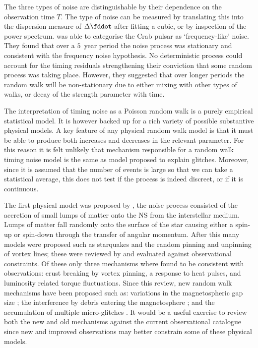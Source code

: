 The three types of noise are distinguishable by their dependence on the
observation time $T$. The type of noise can be measured by translating this
into the dispersion measure of $\Delta\fddot$ after fitting a cubic, or by
inspection of the power spectrum.  \citet{Boynton1972} was able to categorise
the Crab pulsar as `frequency-like' noise.  They found that over a $5$~year
period the noise process was stationary and consistent with the frequency noise
hypothesis. No deterministic process could account for the timing residuals
strengthening their conviction that some random process was taking place.
However, they suggested that over longer periods the random walk will be
non-stationary due to either mixing with other types of walks, or decay of the
strength parameter with time.

The interpretation of timing noise as a Poisson random walk is a purely
empirical statistical model. It is however backed up for a rich variety of
possible substantive physical models.  A key feature of any physical random
walk model is that it must be able to produce both increases and decreases in
the relevant parameter. For this reason it is felt unlikely that mechanism
responsible for a random walk timing noise model is the same as model proposed
to explain glitches. Moreover, since it is assumed that the number of events
is large so that we can take a statistical average, this does not test if the
process is indeed discreet, or if it is continuous.

The first physical model was proposed by \citet{Boynton1972}, the noise process
consisted of the accretion of small lumps of matter onto the NS from the
interstellar medium. Lumps of matter fall randomly onto the surface of the star
causing either a spin-up or spin-down through the transfer of angular momentum.
After this many models were proposed such as starquakes and the random pinning
and unpinning of vortex lines; these were reviewed by \citet{Cordes1981} and
evaluated against observational constraints. Of these only three mechanisms
where found to be consistent with observations: crust breaking by vortex pinning, a
response to heat pulses, and luminosity related torque fluctuations. Since this
review, new random walk mechanisms have been proposed such as: variations in
the magnetospheric gap size \citep{Cheng1987}; the interference by debris entering
the magnetosphere \citep{Cordes2008}; and the accumulation of multiple micro-glitches
\citep{Janssen2006}. It would be a useful exercise to review both the new and
old mechanisms against the current observational catalogue since new and improved
observations may better constrain some of these physical models.

